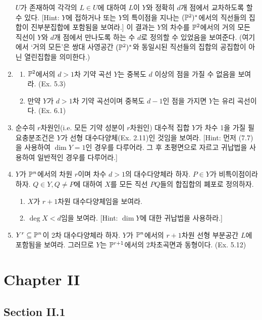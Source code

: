\begin{enumerate}[label=\tb{7.\arabic*.},itemindent=0mm,itemsep=4mm]
		$U$가 존재하여 각각의 $L\in U$에 대하여 $L$이 $Y$와 정확히 $d$개 점에서 교차하도록 할 수 있다.
		[Hint: $Y$에 접하거나 또는 $Y$의 특이점을 지나는 $(\mathbb{P}^2)^*$에서의 직선들의 집합이 진부분집합에 포함됨을 보여라.]
		이 결과는 $Y$의 차수를 $\mathbb{P}^2$에서의 거의 모든 직선이 $Y$와 $d$개 점에서 만나도록 하는 수 $d$로 정의할 수 있었음을 보여준다.
		(여기에서 `거의 모든'은 쌍대 사영공간 $(\mathbb{P}^2)^*$와 동일시된 직선들의 집합의 공집합이 아닌 열린집합을 의미한다.)
		\item \begin{enumerate}[label=(\alph*)]
			\item $\mathbb{P}^2$에서의 $d>1$차 기약 곡선 $Y$는 중복도 $d$ 이상의 점을 가질 수 없음을 보여라. (Ex. 5.3)
			\item 만약 $Y$가 $d>1$차 기약 곡선이며 중복도 $d-1$인 점을 가지면 $Y$는 유리 곡선이다. (Ex. 6.1)
		\end{enumerate}
		\item {} 순수히 $r$차원인(i.e. 모든 기약 성분이 $r$차원인) 대수적 집합 $Y$가 차수 1을 가질 필요충분조건은
		$Y$가 선형 대수다양체(Ex. 2.11)인 것임을 보여라. [Hint: 먼저 (7.7)을 사용하여 $\dim Y=1$인 경우를 다루어라.
		그 후 초평면으로 자르고 귀납법을 사용하여 일반적인 경우를 다루어라.]
		\item $Y$가 $\mathbb{P}^n$에서의 차원 $r$이며 차수 $d>1$의 대수다양체라 하자. $P\in Y$가 비특이점이라 하자.
		$Q\in Y,Q\ne P$에 대하여 $X$를 모든 직선 $PQ$들의 합집합의 폐포로 정의하자.
		\begin{enumerate}[label=(\alph*)]
			\item $X$가 $r+1$차원 대수다양체임을 보여라.
			\item $\deg X<d$임을 보여라. [Hint: $\dim Y$에 대한 귀납법을 사용하라.]
		\end{enumerate}
		\item $Y^r\subseteq\mathbb{P}^n$이 2차 대수다양체라 하자. $Y$가 $\mathbb{P}^n$에서의 $r+1$차원 선형 부분공간 $L$에 포함됨을 보여라.
		그러므로 $Y$는 $\mathbb{P}^{r+1}$에서의 2차초곡면과 동형이다. (Ex. 5.12)
	\end{enumerate}
	
	
	
	\section*{Chapter II}
	
	\subsection*{Section II.1}
	
